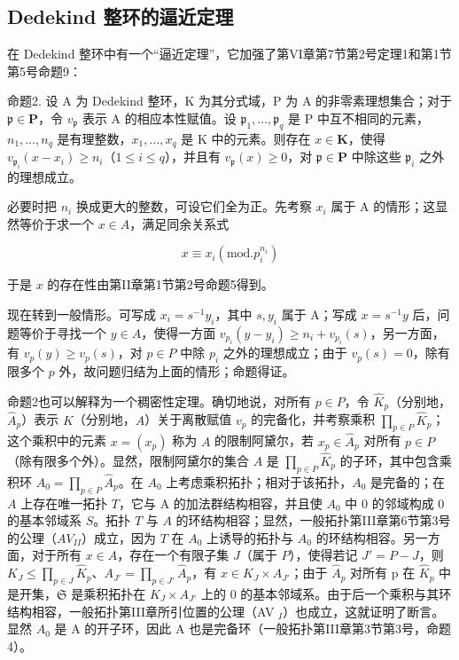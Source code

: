 \subsection{Dedekind 整环的逼近定理}

在 Dedekind 整环中有一个“逼近定理”，它加强了第VI章第7节第2号定理1和第1节第5号命题9：

命题2. 设 A 为 Dedekind 整环，K 为其分式域，P 为 A 的非零素理想集合；对于 \(\mathfrak{p} \in \mathbf{P}\)，令 \(v_{\mathfrak{p}}\) 表示 A 的相应本性赋值。设 \(\mathfrak{p}_1, \ldots, \mathfrak{p}_q\) 是 P 中互不相同的元素，\(n_1, \ldots, n_q\) 是有理整数，\(x_1, \ldots, x_q\) 是 K 中的元素。则存在 \(x \in \mathbf{K}\)，使得 \(v_{\mathfrak{p}_i}(x - x_i) \geqslant n_i\)（\(1 \leqslant i \leqslant q\)），并且有 \(v_{\mathfrak{p}}(x) \geqslant 0\)，对 \(\mathfrak{p} \in \mathbf{P}\) 中除这些 \(\mathfrak{p}_i\) 之外的理想成立。

必要时把 \(n_{i}\) 换成更大的整数，可设它们全为正。先考察 \(x_{i}\) 属于 A 的情形；这显然等价于求一个 \(x \in A\)，满足同余关系式

\[
x \equiv x _ {i} (\mathrm{mod.} p _ {i} ^ {n _ {i}})
\]

于是 \(x\) 的存在性由第II章第1节第2号命题5得到。

现在转到一般情形。可写成 \(x_{i} = s^{-1}y_{i}\)，其中 \(s, y_{i}\) 属于 A；写成 \(x = s^{-1}y\) 后，问题等价于寻找一个 \(y \in A\)，使得一方面 \(v_{p_i}(y - y_i) \geqslant n_i + v_{p_i}(s)\)，另一方面，有 \(v_{p}(y) \geqslant v_{p}(s)\)，对 \(p \in P\) 中除 \(p_i\) 之外的理想成立；由于 \(v_{p}(s) = 0\)，除有限多个 \(p\) 外，故问题归结为上面的情形；命题得证。

命题2也可以解释为一个稠密性定理。确切地说，对所有 \(p \in P\)，令 \(\hat{K}_p\)（分别地，\(\hat{A}_p\)）表示 \(K\)（分别地，\(A\)）关于离散赋值 \(v_p\) 的完备化，并考察乘积 \(\prod_{p \in P} \hat{K}_p\)；这个乘积中的元素 \(x = (x_p)\) 称为 \(A\) 的限制阿黛尔，若 \(x_p \in \hat{A}_p\) 对所有 \(p \in P\)（除有限多个外）。显然，限制阿黛尔的集合 \(A\) 是 \(\prod_{p \in P} \hat{K}_p\) 的子环，其中包含乘积环 \(A_0 = \prod_{p \in P} \hat{A}_p\)。在 \(A_0\) 上考虑乘积拓扑；相对于该拓扑，\(A_0\) 是完备的；在 \(A\) 上存在唯一拓扑 \(T\)，它与 A 的加法群结构相容，并且使 \(A_0\) 中 0 的邻域构成 0 的基本邻域系 \(S\)。拓扑 \(T\) 与 \(A\) 的环结构相容；显然，一般拓扑第III章第6节第3号的公理（\(AV_{II}\)）成立，因为 \(T\) 在 \(A_0\) 上诱导的拓扑与 \(A_0\) 的环结构相容。另一方面，对于所有 \(x \in A\)，存在一个有限子集 \(J\)（属于 \(P\)），使得若记 \(J' = P - J\)，则 \(K_J \leqslant \prod_{p \in J} \hat{K}_p\)、\(A_{J'} = \prod_{p \in J'} \hat{A}_p\)，有 \(x \in K_{J} \times A_{J'}\)；由于 \(\hat{A}_{p}\) 对所有 p 在 \(\hat{K}_{p}\) 中是开集，\(\mathfrak{S}\) 是乘积拓扑在 \(K_{J} \times A_{J'}\) 上的 0 的基本邻域系。由于后一个乘积与其环结构相容，一般拓扑第III章所引位置的公理（AV \(_{I}\)）也成立，这就证明了断言。显然 \(A_{0}\) 是 A 的开子环，因此 A 也是完备环（一般拓扑第III章第3节第3号，命题4）。

